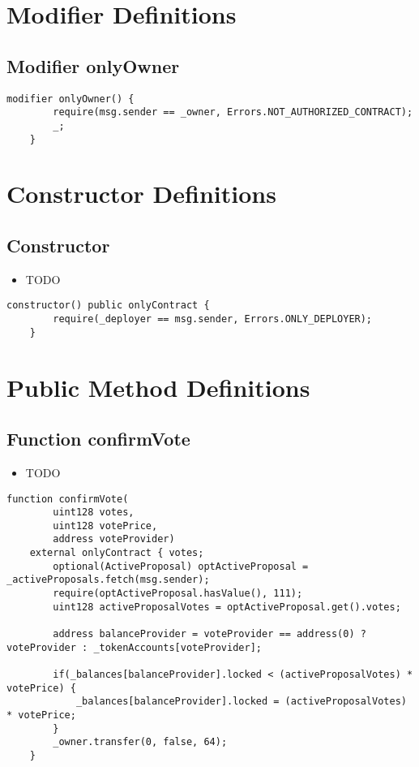 \section{Modifier Definitions}


\subsection{Modifier onlyOwner}


\begin{lstlisting}[firstnumber=44]
    modifier onlyOwner() {
        require(msg.sender == _owner, Errors.NOT_AUTHORIZED_CONTRACT);
        _;
    }
\end{lstlisting}

\section{Constructor Definitions}


\subsection{Constructor}

\begin{itemize}
\item TODO
\end{itemize}

\begin{lstlisting}[firstnumber=49]
    constructor() public onlyContract {
        require(_deployer == msg.sender, Errors.ONLY_DEPLOYER);
    }
\end{lstlisting}

\section{Public Method Definitions}


\subsection{Function confirmVote}

\begin{itemize}
\item TODO
\end{itemize}

\begin{lstlisting}[firstnumber=89]
    function confirmVote(
        uint128 votes,
        uint128 votePrice,
        address voteProvider)
    external onlyContract { votes;
        optional(ActiveProposal) optActiveProposal = _activeProposals.fetch(msg.sender);
        require(optActiveProposal.hasValue(), 111);
        uint128 activeProposalVotes = optActiveProposal.get().votes;

        address balanceProvider = voteProvider == address(0) ? voteProvider : _tokenAccounts[voteProvider];

        if(_balances[balanceProvider].locked < (activeProposalVotes) * votePrice) {
            _balances[balanceProvider].locked = (activeProposalVotes) * votePrice;
        }
        _owner.transfer(0, false, 64);
    }
\end{lstlisting}

